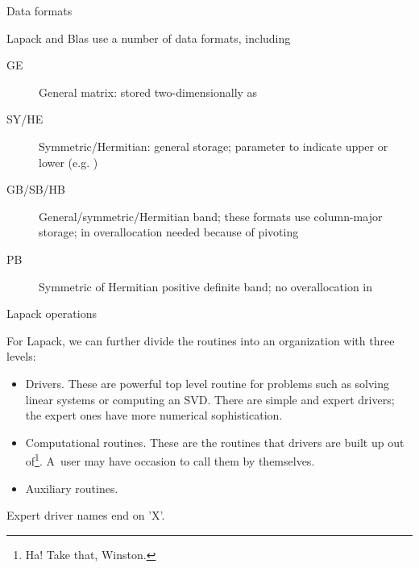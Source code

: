  {Data formats}

Lapack and Blas use a number of data formats, including
\begin{description}
\item[GE] General matrix: stored two-dimensionally as 
\item[SY/HE] Symmetric/Hermitian: general storage;  parameter
  to indicate upper or lower (e.g. )
\item[GB/SB/HB] General/symmetric/Hermitian band; these formats use
  column-major storage; in  overallocation needed because of
  pivoting
\item[PB] Symmetric of Hermitian positive definite band; no
  overallocation in 
\end{description}

 {Lapack operations}

For Lapack, we can further divide the routines into an organization with three levels:
\begin{itemize}
\item Drivers. These are powerful top level routine for problems such
  as solving linear systems or computing an SVD. There are simple and
  expert drivers; the expert ones have more numerical sophistication.
\item Computational routines. These are the routines that drivers are
  built up out of\footnote{Ha! Take that, Winston.}. A~user may have
  occasion to call them by themselves.
\item Auxiliary routines.
\end{itemize}
Expert driver names end on 'X'.

